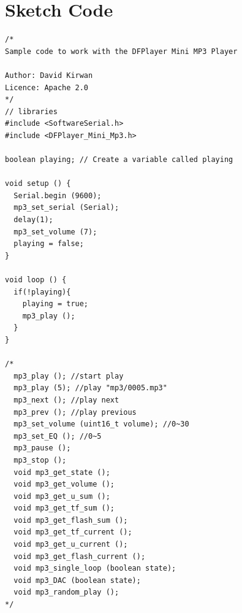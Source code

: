\section*{Sketch Code}
\label{sketch:exp4}
\begin{lstlisting}
/*
Sample code to work with the DFPlayer Mini MP3 Player

Author: David Kirwan
Licence: Apache 2.0
*/
// libraries
#include <SoftwareSerial.h>
#include <DFPlayer_Mini_Mp3.h>

boolean playing; // Create a variable called playing

void setup () {
  Serial.begin (9600);
  mp3_set_serial (Serial);
  delay(1);
  mp3_set_volume (7);
  playing = false;
}

void loop () {
  if(!playing){
    playing = true;
    mp3_play ();
  }
}

/*
  mp3_play (); //start play
  mp3_play (5); //play "mp3/0005.mp3"
  mp3_next (); //play next
  mp3_prev (); //play previous
  mp3_set_volume (uint16_t volume); //0~30
  mp3_set_EQ (); //0~5
  mp3_pause ();
  mp3_stop ();
  void mp3_get_state ();
  void mp3_get_volume ();
  void mp3_get_u_sum ();
  void mp3_get_tf_sum ();
  void mp3_get_flash_sum ();
  void mp3_get_tf_current ();
  void mp3_get_u_current ();
  void mp3_get_flash_current ();
  void mp3_single_loop (boolean state);
  void mp3_DAC (boolean state);
  void mp3_random_play ();
*/

\end{lstlisting}